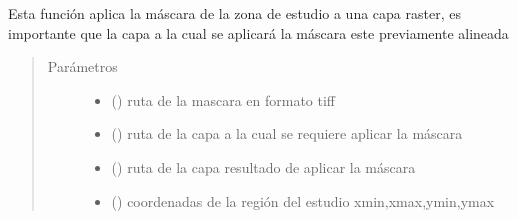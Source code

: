 \documentclass[letterpaper,10pt,spanish]{sphinxmanual}
\begin{document}

\begin{fulllineitems}
\label{\detokenize{apcsig:apcsig.aplica_mascara}}
Esta función aplica la máscara de la zona de estudio a una capa raster, 
es importante que la capa a la cual se aplicará la máscara este previamente alineada
\begin{quote}\begin{description}
\item[{Parámetros}] \leavevmode\begin{itemize}
\item {} 
 () \textendash{} ruta de la mascara en formato tiff

\item {} 
 () \textendash{} ruta de la capa a la cual se requiere aplicar la máscara

\item {} 
 () \textendash{} ruta de la capa resultado de aplicar la máscara

\item {} 
 () \textendash{} coordenadas de la región del estudio  xmin,xmax,ymin,ymax

\end{itemize}

\end{description}\end{quote}

\end{fulllineitems}

\end{document}
